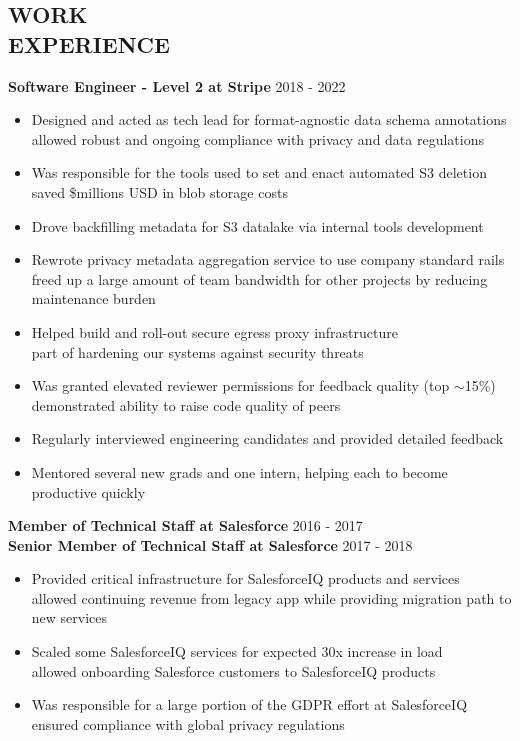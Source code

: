 \documentclass[line,margin]{res}
\begin{document}
\begin{resume}
\section{\textcolor{HeaderColor}{WORK \\ EXPERIENCE}}
	      {\sc \textbf{Software Engineer - Level 2 at Stripe}} \hfill 2018 - 2022
                 \begin{itemize}  \itemsep -2pt %
                 \item Designed and acted as tech lead for format-agnostic data schema annotations \\ allowed robust and ongoing compliance with privacy and data regulations
                 \item Was responsible for the tools used to set and enact automated S3 deletion \\  saved \$millions USD in blob storage costs
                 \item Drove backfilling metadata for S3 datalake via internal tools development
	             \item Rewrote privacy metadata aggregation service to use company standard rails \\ freed up a large amount of team bandwidth for other projects by reducing maintenance burden
                 \item Helped build and roll-out secure egress proxy infrastructure \\ part of hardening our systems against security threats
                 \item Was granted elevated reviewer permissions for feedback quality (top $\sim$15\%) \\ demonstrated ability to raise code quality of peers
                 \item Regularly interviewed engineering candidates and provided detailed feedback
                 \item Mentored several new grads and one intern, helping each to become productive quickly
                 \end{itemize}

	      {\sc \textbf{Member of Technical Staff at Salesforce}} \hfill 2016 - 2017 \\
	      {\sc \textbf{Senior Member of Technical Staff at Salesforce}} \hfill 2017 - 2018
                 \begin{itemize}  \itemsep -2pt %
	             \item Provided critical infrastructure for SalesforceIQ products and services \\ allowed continuing revenue from legacy app while providing migration path to new services
                 \item Scaled some SalesforceIQ services for expected 30x increase in load \\ allowed onboarding Salesforce customers to SalesforceIQ products
                 \item Was responsible for a large portion of the GDPR effort at SalesforceIQ \\ ensured compliance with global privacy regulations
                 \end{itemize}


\end{resume}
\end{document}
